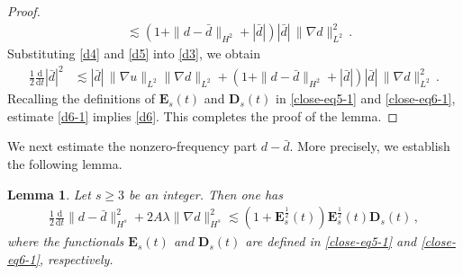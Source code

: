 \documentclass[reqno,11pt]{amsart}
\newtheorem{lemma}{Lemma}[section]
\numberwithin{equation}{section}
\def\d{\mathrm{d}}
\begin{document}
\begin{proof}
\begin{equation}
\begin{aligned}
&\lesssim \left( 1 + \|d - \bar{d}\|_{H^2} + |\bar{d}| \right) |\bar{d}| \, \|\nabla d\|_{L^2}^2 \,.  
\end{aligned}
\end{equation}
Substituting \eqref{d4} and \eqref{d5} into \eqref{d3}, we obtain
  \begin{equation}\label{d6-1}
\begin{aligned}  
\frac{1}{2} \frac{\d}{\d t} |\bar{d}|^2 & \lesssim |\bar{d}| \, \|\nabla u\|_{L^2} \|\nabla d\|_{L^2} + \left( 1 + \|d - \bar{d}\|_{H^2} + |\bar{d}| \right) |\bar{d}| \, \|\nabla d\|_{L^2}^2 \,.
\end{aligned}
\end{equation}
Recalling the definitions of $\mathbf{E}_s(t)$ and $\mathbf{D}_s(t)$ in \eqref{close-eq5-1} and \eqref{close-eq6-1}, estimate \eqref{d6-1} implies \eqref{d6}. This completes the proof of the lemma.
\end{proof}


We next estimate the nonzero-frequency part $d - \bar{d}$. More precisely, we establish the following lemma.

\begin{lemma}\label{Lmm-G2}
    Let $s \ge 3$ be an integer. Then one has
    \begin{equation}\label{d13}
\begin{aligned}
\frac{1}{2} \frac{\d}{\d t} \| d - \bar{d} \|_{H^s}^2 + 2A \lambda \| \nabla d \|_{H^s}^2 \lesssim ( 1 + \mathbf{E}_s^\frac{1}{2} (t) ) \mathbf{E}_s^\frac{1}{2} (t) \mathbf{D}_s (t) \,,
 \end{aligned}
 \end{equation}
 where the functionals $\mathbf{E}_s (t)$ and $\mathbf{D}_s (t)$ are defined  in \eqref{close-eq5-1} and \eqref{close-eq6-1}, respectively.
\end{lemma}
\end{document}
